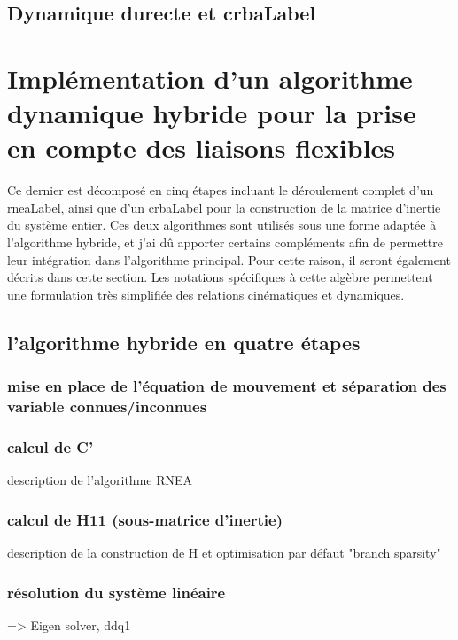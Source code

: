 \documentclass{report}
\begin{document}
\section{Dynamique durecte et \gls{crbaLabel}}



\chapter{Implémentation d'un algorithme dynamique hybride pour la prise en compte des liaisons flexibles}

Ce dernier est décomposé en cinq étapes incluant le déroulement complet d'un \gls{rneaLabel}, ainsi que d'un \gls{crbaLabel} pour la construction de la matrice d'inertie du système entier. Ces deux algorithmes sont utilisés sous une forme adaptée à l'algorithme hybride, et j'ai dû apporter certains compléments afin de permettre leur intégration dans l'algorithme principal. Pour cette raison, il seront également décrits dans cette section. Les notations spécifiques à cette algèbre permettent une formulation très simplifiée des relations cinématiques et dynamiques.\\


\section{l'algorithme hybride en quatre étapes}

\subsection{mise en place de l'équation de mouvement et séparation des variable connues/inconnues}

\subsection{calcul de C'}
description de l'algorithme RNEA

\subsection{calcul de H11 (sous-matrice d'inertie)}
description de la construction de H et optimisation par défaut "branch sparsity"

\subsection{résolution du système linéaire}
=> Eigen solver, ddq1
\end{document}
